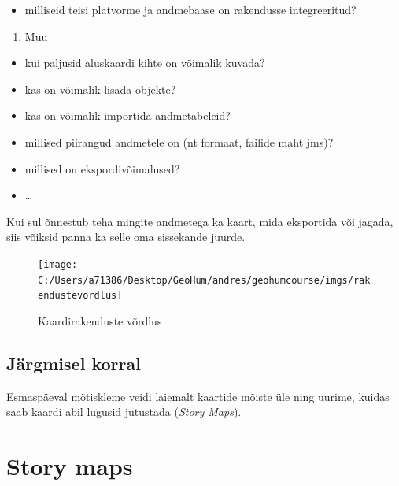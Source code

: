 \documentclass[
]{book}
\providecommand{\tightlist}{%
  \setlength{\itemsep}{0pt}\setlength{\parskip}{0pt}}
\begin{document}
\begin{itemize}
\tightlist
\item
  milliseid teisi platvorme ja andmebaase on rakendusse integreeritud?\\
\end{itemize}

\begin{enumerate}
\def\labelenumi{\arabic{enumi}.}
\setcounter{enumi}{3}
\tightlist
\item
  Muu
\end{enumerate}

\begin{itemize}
\tightlist
\item
  kui paljusid aluskaardi kihte on võimalik kuvada?\\
\item
  kas on võimalik lisada objekte?
\item
  kas on võimalik importida andmetabeleid?
\item
  millised piirangud andmetele on (nt formaat, failide maht jms)?
\item
  millised on ekspordivõimalused?
\item
  \ldots{}
\end{itemize}

Kui sul õnnestub teha mingite andmetega ka kaart, mida eksportida või jagada, siis võiksid panna ka selle oma sissekande juurde.

\begin{figure}

{\centering \texttt{[image: C:/Users/a71386/Desktop/GeoHum/andres/geohumcourse/imgs/rakendustevordlus]} 

}

\caption{Kaardirakenduste võrdlus}\label{fig:rakendused}
\end{figure}

\hypertarget{juxe4rgmisel-korral-2}{%
\section{Järgmisel korral}\label{juxe4rgmisel-korral-2}}

Esmaspäeval mõtiskleme veidi laiemalt kaartide mõiste üle ning uurime, kuidas saab kaardi abil lugusid jutustada (\emph{Story Maps}).

\hypertarget{storymaps}{%
\chapter{Story maps}\label{storymaps}}
\end{document}

